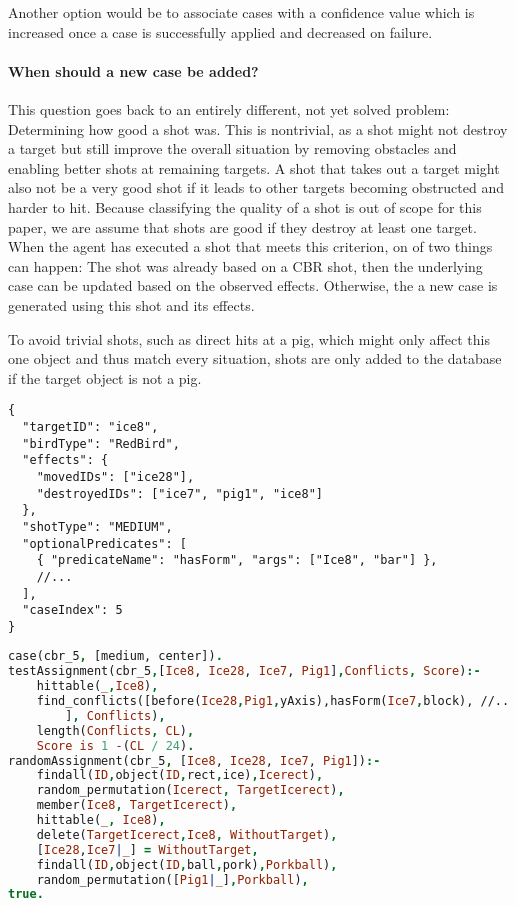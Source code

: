 Another option would be to associate cases with a confidence value which is increased once a case is successfully applied and decreased on failure.

\paragraph{When should a new case be added?}
This question goes back to an entirely different, not yet solved problem: Determining how good a shot was.
This is nontrivial, as a shot might not destroy a target but still improve the overall situation by removing obstacles and enabling better shots at remaining targets.
A shot that takes out a target might also not be a very good shot if it leads to other targets becoming obstructed and harder to hit.
Because classifying the quality of a shot is out of scope for this paper, we are assume that shots are good if they destroy at least one target.
When the agent has executed a shot that meets this criterion, on of two things can happen: The shot was already based on a CBR shot, then the underlying case can be updated based on the observed effects. Otherwise, the a new case is generated using this shot and its effects.

To avoid trivial shots, such as direct hits at a pig, which might only affect this one object and thus match every situation, shots are only added to the database if the target object is not a pig.

\begin{lstlisting}[caption=case information outside of Prolog]
{
  "targetID": "ice8",
  "birdType": "RedBird",
  "effects": {
    "movedIDs": ["ice28"],
    "destroyedIDs": ["ice7", "pig1", "ice8"]
  },
  "shotType": "MEDIUM",
  "optionalPredicates": [
    { "predicateName": "hasForm", "args": ["Ice8", "bar"] },
    //...
  ],
  "caseIndex": 5
}    
\end{lstlisting}

\begin{lstlisting}[label=lst:case-prolog, language=Prolog, caption=case information in Prolog]
case(cbr_5, [medium, center]).
testAssignment(cbr_5,[Ice8, Ice28, Ice7, Pig1],Conflicts, Score):-
    hittable(_,Ice8),
    find_conflicts([before(Ice28,Pig1,yAxis),hasForm(Ice7,block), //...
        ], Conflicts),
    length(Conflicts, CL),
    Score is 1 -(CL / 24).
randomAssignment(cbr_5, [Ice8, Ice28, Ice7, Pig1]):-
    findall(ID,object(ID,rect,ice),Icerect),
    random_permutation(Icerect, TargetIcerect),
    member(Ice8, TargetIcerect),
    hittable(_, Ice8),
    delete(TargetIcerect,Ice8, WithoutTarget),
    [Ice28,Ice7|_] = WithoutTarget,
    findall(ID,object(ID,ball,pork),Porkball),
    random_permutation([Pig1|_],Porkball),
true.
\end{lstlisting}